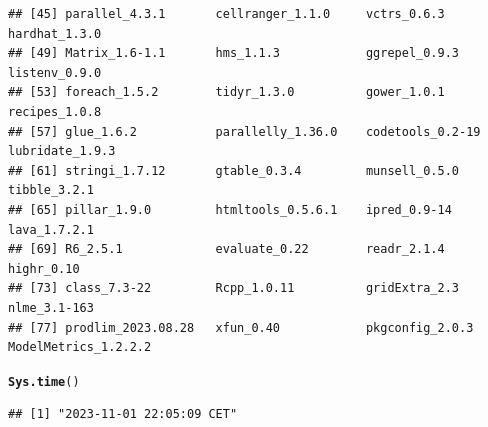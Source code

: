 \documentclass{article}\usepackage[]{graphicx}\usepackage[]{xcolor}
\makeatletter
\newcommand{\hlstd}[1]{\textcolor[rgb]{0.345,0.345,0.345}{#1}}%
\newcommand{\hlkwd}[1]{\textcolor[rgb]{0.737,0.353,0.396}{\textbf{#1}}}%
\newenvironment{kframe}{%
 \def\at@end@of@kframe{}%
 \ifinner\ifhmode%
  \def\at@end@of@kframe{\end{minipage}}%
  \begin{minipage}{\columnwidth}%
 \fi\fi%
 \def\FrameCommand##1{\hskip\@totalleftmargin \hskip-\fboxsep
 \colorbox{shadecolor}{##1}\hskip-\fboxsep
     \hskip-\linewidth \hskip-\@totalleftmargin \hskip\columnwidth}%
 \MakeFramed {\advance\hsize-\width
   \@totalleftmargin\z@ \linewidth\hsize
   \@setminipage}}%
 {\par\unskip\endMakeFramed%
 \at@end@of@kframe}
\newenvironment{knitrout}{}{} %
\makeatother
\begin{document}
\begin{knitrout}
\begin{kframe}
\begin{verbatim}
## [45] parallel_4.3.1       cellranger_1.1.0     vctrs_0.6.3          hardhat_1.3.0       
## [49] Matrix_1.6-1.1       hms_1.1.3            ggrepel_0.9.3        listenv_0.9.0       
## [53] foreach_1.5.2        tidyr_1.3.0          gower_1.0.1          recipes_1.0.8       
## [57] glue_1.6.2           parallelly_1.36.0    codetools_0.2-19     lubridate_1.9.3     
## [61] stringi_1.7.12       gtable_0.3.4         munsell_0.5.0        tibble_3.2.1        
## [65] pillar_1.9.0         htmltools_0.5.6.1    ipred_0.9-14         lava_1.7.2.1        
## [69] R6_2.5.1             evaluate_0.22        readr_2.1.4          highr_0.10          
## [73] class_7.3-22         Rcpp_1.0.11          gridExtra_2.3        nlme_3.1-163        
## [77] prodlim_2023.08.28   xfun_0.40            pkgconfig_2.0.3      ModelMetrics_1.2.2.2
\end{verbatim}
\begin{alltt}
\hlkwd{Sys.time}\hlstd{()}
\end{alltt}
\begin{verbatim}
## [1] "2023-11-01 22:05:09 CET"
\end{verbatim}
\end{kframe}
\end{knitrout}
\end{document}
